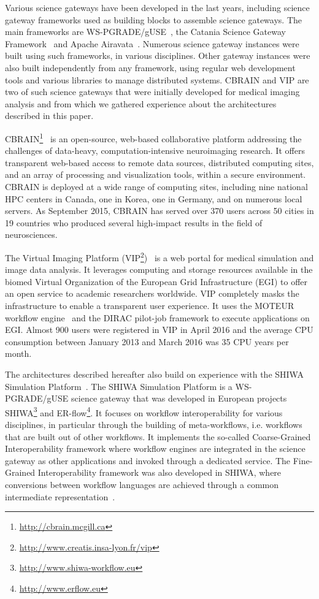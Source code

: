 \documentclass[preprint,3p,twocolumn]{elsarticle}
\begin{document}
Various science gateways have been developed in the last years,
including science gateway frameworks used as building blocks to
assemble science gateways. The main frameworks are
WS-PGRADE/gUSE~\cite{Kacsuk2012}, the Catania Science Gateway
Framework~\cite{Ardizzone2012} and Apache
Airavata~\cite{marru2011apache}. Numerous science gateway instances
were built using such frameworks, in various disciplines. Other
gateway instances were also built independently from any framework,
using regular web development tools and various libraries to manage
distributed systems. CBRAIN and VIP are two of such science gateways
that were initially developed for medical imaging analysis and from
which we gathered experience about the architectures described in
this paper.

CBRAIN\footnote{\url{http://cbrain.mcgill.ca}}~\cite{SHER-14} is an
open-source, web-based collaborative platform addressing the
challenges of data-heavy, computation-intensive neuroimaging
research. It offers transparent web-based access to remote data
sources, distributed computing sites, and an array of processing and
visualization tools, within a secure environment. CBRAIN is deployed
at a wide range of computing sites, including nine national HPC
centers in Canada, one in Korea, one in Germany, and on numerous local
servers. As September 2015, CBRAIN has served over 370 users across 50
cities in 19 countries who produced several high-impact results in the
field of neurosciences.

The Virtual Imaging Platform
(VIP\footnote{\url{http://www.creatis.insa-lyon.fr/vip}})~\cite{GLAT-13}
is a web portal for medical simulation and image data analysis. It
leverages computing and storage resources available in the biomed
Virtual Organization of the European Grid Infrastructure (EGI) to
offer an open service to academic researchers worldwide. VIP
completely masks the infrastructure to enable a transparent user
experience. It uses the MOTEUR workflow engine~\cite{GLAT-13} and the
DIRAC pilot-job framework to execute applications on EGI. Almost 900
users were registered in VIP in April 2016 and the average CPU
consumption between January 2013 and March 2016 was 35 CPU years per
month.

The architectures described hereafter also build on experience with
the SHIWA Simulation Platform~\cite{terstyanszky2014enabling}. The
SHIWA Simulation Platform is a WS-PGRADE/gUSE science gateway that was
developed in European projects
SHIWA\footnote{\url{http://www.shiwa-workflow.eu}} and
ER-flow\footnote{\url{http://www.erflow.eu}}. It focuses on workflow
interoperability for various disciplines, in particular through the
building of meta-workflows, i.e. workflows that are built out of other
workflows. It implements the so-called Coarse-Grained Interoperability
framework where workflow engines are integrated in the science gateway
as other applications and invoked through a dedicated service. The
Fine-Grained Interoperability framework was also developed in SHIWA,
where conversions between workflow languages are achieved through a
common intermediate
representation~\cite{plankensteiner-prodan-etal:2013}.
\end{document}
